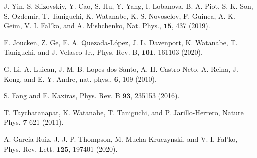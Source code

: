 \documentclass[showpacs,aps,prb,reprint,twocolumn]{revtex4-1}
\begin{document}
\begin{thebibliography}{99}

 



 J. Yin, S. Slizovskiy, Y. Cao, S. Hu, Y. Yang, I. Lobanova, B. A. Piot, S.-K. Son, S. Ozdemir, T. Taniguchi, K. Watanabe, K. S. Novoselov, F. Guinea, A. K. Geim, V. I. Fal'ko, and A. Mishchenko, Nat. Phys., $\mathbf{15}$, 437 (2019).

 F. Joucken, Z. Ge, E. A. Quezada-López, J. L. Davenport, K. Watanabe, T. Taniguchi, and J. Velasco Jr., Phys. Rev. B, $\mathbf{101}$, 161103 (2020).

 G. Li, A. Luican, J. M. B. Lopes dos Santo, A. H. Castro Neto, A. Reina, J. Kong, and E. Y. Andre, nat. phys., $\mathbf{6}$, 109 (2010).



 S. Fang and E. Kaxiras, Phys. Rev. B $\mathbf{93}$, 235153 (2016). 

 T. Taychatanapat, K. Watanabe, T. Taniguchi, and P. Jarillo-Herrero, Nature Phys. $\mathbf{7}$ 621 (2011).

 A. Garcia-Ruiz, J. J. P. Thompson, M. Mucha-Kruczynski, and V. I. Fal'ko, Phys. Rev. Lett. $\mathbf{125}$, 197401 (2020).

\end{thebibliography}
\end{document}
